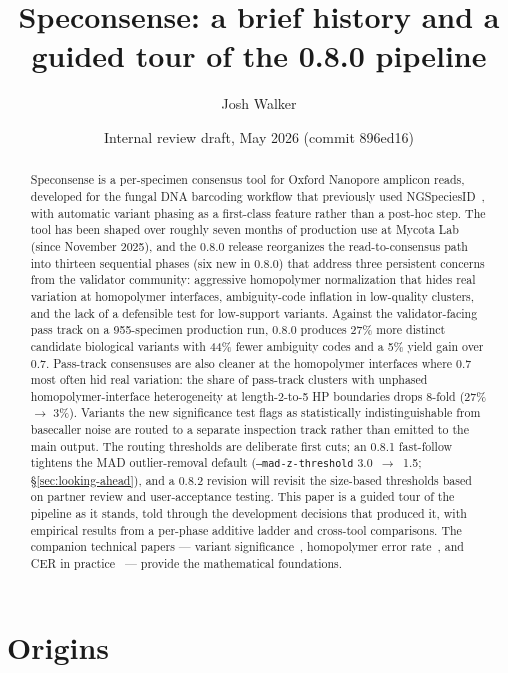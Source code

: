 \documentclass[11pt]{article}
\title{Speconsense: a brief history and a guided tour of the 0.8.0 pipeline}
\author{Josh Walker}
\date{Internal review draft, May 2026 (commit 896ed16)}
\begin{document}
\sloppy
\maketitle
\linenumbers

\begin{abstract}
Speconsense is a per-specimen consensus tool for Oxford Nanopore amplicon
reads, developed for the fungal DNA barcoding workflow that previously used
NGSpeciesID~\cite{ngspeciesid}, with automatic variant phasing as a
first-class feature rather than a post-hoc step. The tool has been shaped over roughly seven months
of production use at Mycota Lab (since November 2025), and the 0.8.0 release
reorganizes the read-to-consensus path into thirteen sequential phases (six
new in 0.8.0) that address three persistent concerns from the validator
community: aggressive
homopolymer normalization that hides real variation at homopolymer interfaces,
ambiguity-code inflation in low-quality clusters, and the lack of a defensible
test for low-support variants. Against the validator-facing pass track on a
955-specimen production run, 0.8.0 produces 27\% more distinct candidate
biological variants with 44\% fewer ambiguity codes and a 5\% yield gain
over 0.7.
Pass-track consensuses are also cleaner at the homopolymer interfaces
where 0.7 most often hid real variation: the share of pass-track
clusters with unphased homopolymer-interface heterogeneity at
length-2-to-5 HP boundaries drops 8-fold (27\% $\to$ 3\%). Variants the
new significance test flags as statistically indistinguishable from
basecaller noise are routed to a separate inspection track rather than
emitted to the main output. The routing thresholds are deliberate first
cuts; an 0.8.1 fast-follow tightens the MAD outlier-removal default
(\texttt{--mad-z-threshold} 3.0~$\to$~1.5; §\ref{sec:looking-ahead}),
and a 0.8.2 revision will revisit the size-based thresholds based on
partner review and user-acceptance testing. This
paper is a guided tour of the pipeline as it stands, told through the
development decisions that produced it, with empirical results from a per-phase
additive ladder and cross-tool comparisons. The companion technical papers --- variant
significance~\cite{cer_paper}, homopolymer error rate~\cite{hp_paper}, and
CER in practice~\cite{cer_in_practice} --- provide the mathematical foundations.
\end{abstract}

\section{Origins}
\end{document}
